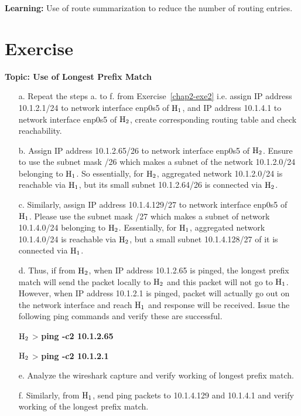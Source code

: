 \begin{multicols}{2}
\textbf{Learning:} Use of route summarization to reduce the number of routing entries.

\section*{Exercise \label{chap2-exe4}}

\textbf{Topic: Use of Longest Prefix Match}

\begin{itemize}
\item[a.] Repeat the steps a. to f. from  Exercise~\ref{chap2-exe2} i.e. assign IP address 10.1.2.1/24 to network interface enp0s5 of ${\rm H}_{1}$, and IP address 10.1.4.1 to network interface enp0s5 of ${\rm H}_{2}$, create corresponding routing table and check reachability.

\item[b.] Assign IP address 10.1.2.65/26 to network interface enp0s5 of ${\rm H}_{2}$. Ensure to use the subnet mask /26 which makes a subnet of the network 10.1.2.0/24 belonging to ${\rm H}_{1}$. So essentially, for ${\rm H}_{2}$, aggregated network 10.1.2.0/24 is reachable via ${\rm H}_{1}$, but its small subnet 10.1.2.64/26 is connected via ${\rm H}_{2}$.

\item[c.] Similarly, assign IP address 10.1.4.129/27 to network interface enp0s5 of ${\rm H}_{1}$. Please use the subnet mask /27 which makes a subnet of network 10.1.4.0/24 belonging to ${\rm H}_{2}$. Essentially, for ${\rm H}_{1}$, aggregated network 10.1.4.0/24 is reachable via ${\rm H}_{2}$, but a small subnet 10.1.4.128/27 of it is connected via ${\rm H}_{1}$.

\item[d.] Thus, if from ${\rm H}_{2}$, when IP address 10.1.2.65 is pinged, the longest prefix match will send the packet locally to ${\rm H}_{2}$ and this packet will not go to ${\rm H}_{1}$. However, when IP address 10.1.2.1 is pinged, packet will actually go out on the network interface and reach ${\rm H}_{1}$ and response will be received. Issue the following ping commands and verify these are successful.

${\rm H}_{2}$ > \textbf{ping -c2 10.1.2.65}

${\rm H}_{2}$ > \textbf{ping -c2 10.1.2.1}

\item[e.] Analyze the wireshark capture and verify working of longest prefix match.

\item[f.] Similarly, from ${\rm H}_{1}$, send ping packets to 10.1.4.129 and 10.1.4.1 and verify working of the longest prefix match.


\end{itemize}
\end{multicols}

